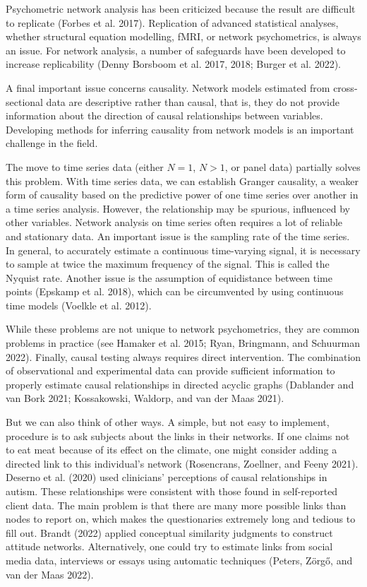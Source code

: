 \documentclass[
  a4paper,
  DIV=11,
  numbers=noendperiod]{scrreprt}
\begin{document}
Psychometric network analysis has been criticized because the result are
difficult to replicate (Forbes et al. 2017). Replication of advanced
statistical analyses, whether structural equation modelling, fMRI, or
network psychometrics, is always an issue. For network analysis, a
number of safeguards have been developed to increase replicability
(Denny Borsboom et al. 2017, 2018; Burger et al. 2022).

A final important issue concerns causality. Network models estimated
from cross-sectional data are descriptive rather than causal, that is,
they do not provide information about the direction of causal
relationships between variables. Developing methods for inferring
causality from network models is an important challenge in the field.

The move to time series data (either \(N=1\), \(N>1\), or panel data)
partially solves this problem. With time series data, we can establish
Granger causality, a weaker form of causality based on the predictive
power of one time series over another in a time series analysis.
However, the relationship may be spurious, influenced by other
variables. Network analysis on time series often requires a lot of
reliable and stationary data. An important issue is the sampling rate of
the time series. In general, to accurately estimate a continuous
time-varying signal, it is necessary to sample at twice the maximum
frequency of the signal. This is called the Nyquist rate. Another issue
is the assumption of equidistance between time points (Epskamp et al.
2018), which can be circumvented by using continuous time models
(Voelkle et al. 2012).

While these problems are not unique to network psychometrics, they are
common problems in practice (see Hamaker et al. 2015; Ryan, Bringmann,
and Schuurman 2022). Finally, causal testing always requires direct
intervention. The combination of observational and experimental data can
provide sufficient information to properly estimate causal relationships
in directed acyclic graphs (Dablander and van Bork 2021; Kossakowski,
Waldorp, and van der Maas 2021).

But we can also think of other ways. A simple, but not easy to
implement, procedure is to ask subjects about the links in their
networks. If one claims not to eat meat because of its effect on the
climate, one might consider adding a directed link to this individual's
network (Rosencrans, Zoellner, and Feeny 2021). Deserno et al. (2020)
used clinicians' perceptions of causal relationships in autism. These
relationships were consistent with those found in self-reported client
data. The main problem is that there are many more possible links than
nodes to report on, which makes the questionaries extremely long and
tedious to fill out. Brandt (2022) applied conceptual similarity
judgments to construct attitude networks. Alternatively, one could try
to estimate links from social media data, interviews or essays using
automatic techniques (Peters, Zörgő, and van der Maas 2022).
\end{document}
